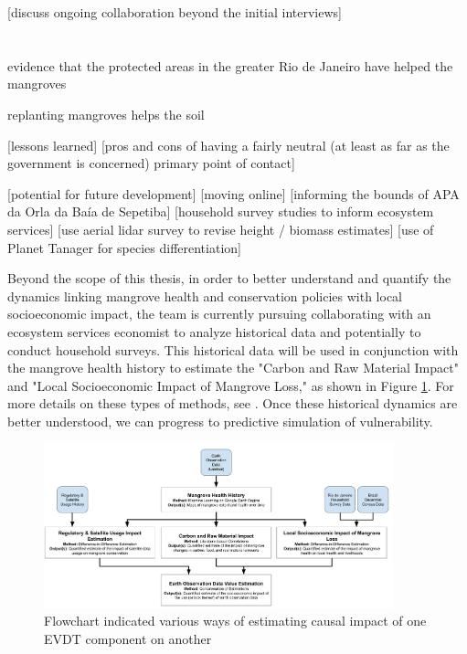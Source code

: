 [discuss ongoing collaboration beyond the initial interviews]


\section{} \label{sec:rio-discussion}


evidence that the protected areas in the greater Rio de Janeiro have helped the mangroves \cite{cavalcantiEvaluatingMangroveConservation2009}

replanting mangroves helps the soil \cite{jimenezRecoverySoilProcesses2022}

[lessons learned]
	[pros and cons of having a fairly neutral (at least as far as the government is concerned) primary point of contact]
	
[potential for future development]
	[moving online]
	[informing the bounds of APA da Orla da Baía de Sepetiba]
	[household survey studies to inform ecosystem services]
	[use aerial lidar survey to revise height / biomass estimates]
	[use of Planet Tanager for species differentiation]

Beyond the scope of this thesis, in order to better understand and quantify the dynamics linking mangrove health and conservation policies with local socioeconomic impact, the team is currently pursuing collaborating with an ecosystem services economist to analyze historical data and potentially to conduct household surveys. This historical data will be used in conjunction with the mangrove health history to estimate the "Carbon and Raw Material Impact" and "Local Socioeconomic Impact of Mangrove Loss," as shown in Figure \ref{fig:method}. For more details on these types of methods, see \cite{jungBrazilNationalEnvironmental2017, jungPartnershipsPreventDeforestation2018}. Once these historical dynamics are better understood, we can progress to predictive simulation of vulnerability.




\begin{figure}[t] 
\centering
\includegraphics[width=0.9\textwidth]{Figures/chap4/Method_Flowchart.png}
\caption{Flowchart indicated various ways of estimating causal impact of one EVDT component on another}
\label{fig:method}
\end{figure}


